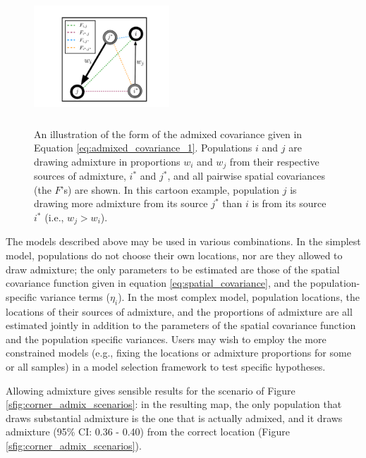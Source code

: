 \documentclass[12pt]{article}
\newcommand{\identifyadmixsource}[1]{{#1^{*}}}
\begin{document}
\begin{figure}[htp!]
	\centering
	\includegraphics[width=2in,height=2in]{figs/admix_cov_fig.pdf}
	\caption{An illustration of the form of the admixed covariance given in Equation \eqref{eq:admixed_covariance_1}.  Populations $i$ and $j$ are drawing admixture in proportions $w_i$ and $w_j$ from their respective sources of admixture, $\identifyadmixsource{i}$ and $\identifyadmixsource{j}$, and all pairwise spatial covariances (the $F$'s) are shown.  In this cartoon example, population $j$ is drawing more admixture from its source $\identifyadmixsource{j}$ than $i$ is from its source $\identifyadmixsource{i}$ (i.e., $w_j > w_i$).
    }
\label{sfig:admixed_cov_diagram}
\end{figure}

The models described above may be used in various combinations.  In the simplest model, populations do not choose their own locations, nor are they allowed to draw admixture; the only parameters to be estimated are those of the spatial covariance function given in equation \eqref{eq:spatial_covariance}, and the population-specific variance terms ($\eta_i$).  In the most complex model, population locations, the locations of their sources of admixture, and the proportions of admixture are all estimated jointly in addition to the parameters of the spatial covariance function and the population specific variances.  Users may wish to employ the more constrained models (e.g., fixing the locations or admixture proportions for some or all samples) in a model selection framework to test specific hypotheses.

Allowing admixture gives sensible results for the scenario of Figure \ref{sfig:corner_admix_scenarios}:
in the resulting map,
the only population that draws substantial admixture is the one that is actually admixed, 
and it draws admixture (95\% CI: 0.36 - 0.40) from the correct location (Figure \ref{sfig:corner_admix_scenarios}).
\end{document}
